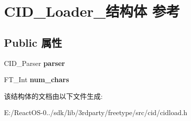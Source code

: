 \hypertarget{struct_c_i_d___loader__}{}\section{C\+I\+D\+\_\+\+Loader\+\_\+结构体 参考}
\label{struct_c_i_d___loader__}
\subsection*{Public 属性}
\begin{DoxyCompactItemize}
\item 
\mbox{\label{struct_c_i_d___loader___a0bafc6472ab5a55a7ff6157607acbd92}} 
C\+I\+D\+\_\+\+Parser {\bfseries parser}
\item 
\mbox{\label{struct_c_i_d___loader___a9f72a02ab6f17abb1c9326887bfd67bc}} 
F\+T\+\_\+\+Int {\bfseries num\+\_\+chars}
\end{DoxyCompactItemize}


该结构体的文档由以下文件生成\+:\begin{DoxyCompactItemize}
\item 
E\+:/\+React\+O\+S-\/0../sdk/lib/3rdparty/freetype/src/cid/cidload.\+h\end{DoxyCompactItemize}
